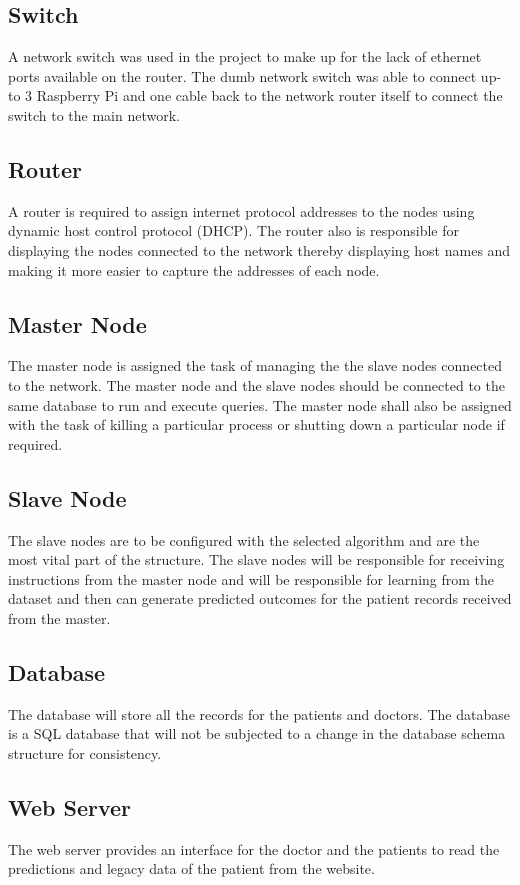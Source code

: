 \documentclass[12pt]{article}
\begin{document}
\subsection{Switch}
A network switch was used in the project to make up for the lack of ethernet ports available on the router. The dumb network switch 
was able to connect up-to 3 Raspberry Pi and one cable back to the network router itself to connect the switch to the main network.

\subsection{Router}
A router is required to assign internet protocol addresses to the nodes using dynamic host control protocol (DHCP). The router also is responsible for displaying the nodes connected to the network thereby displaying host names and making it more easier to capture the addresses of each node.

\subsection{Master Node}
The master node is assigned the task of managing the the slave nodes connected to the network. The master node and the slave nodes should be connected to the same database to run and execute queries. The master node shall also be assigned with the task of killing a particular process or shutting down a particular node if required.

\subsection{Slave Node}
The slave nodes are to be configured with the selected algorithm and are the most vital part of the structure. The slave nodes will be responsible for receiving instructions from the master node and will be responsible for learning from the dataset and then can generate predicted outcomes for the patient records received from the master. 

\subsection{Database}
The database will store all the records for the patients and doctors. The database is a SQL database that will not be subjected to a change in the database schema structure for consistency.

\subsection{Web Server}
The web server provides an interface for the doctor and the patients to read the predictions and legacy data of the patient from the website.
\end{document}
